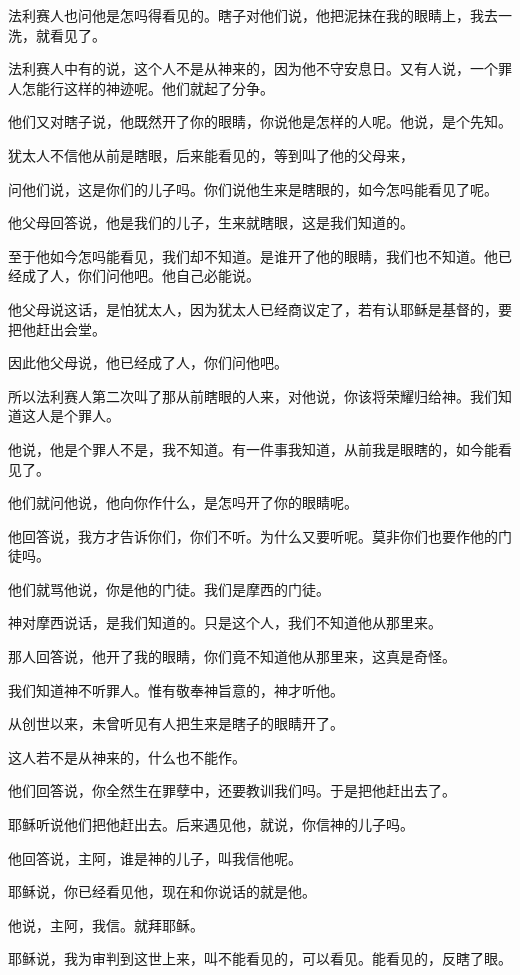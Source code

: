 \documentclass[12pt,oneside]{book}
\begin{document}
法利赛人也问他是怎吗得看见的。瞎子对他们说，他把泥抹在我的眼睛上，我去一洗，就看见了。

法利赛人中有的说，这个人不是从神来的，因为他不守安息日。又有人说，一个罪人怎能行这样的神迹呢。他们就起了分争。

他们又对瞎子说，他既然开了你的眼睛，你说他是怎样的人呢。他说，是个先知。

犹太人不信他从前是瞎眼，后来能看见的，等到叫了他的父母来，

问他们说，这是你们的儿子吗。你们说他生来是瞎眼的，如今怎吗能看见了呢。

他父母回答说，他是我们的儿子，生来就瞎眼，这是我们知道的。

至于他如今怎吗能看见，我们却不知道。是谁开了他的眼睛，我们也不知道。他已经成了人，你们问他吧。他自己必能说。

他父母说这话，是怕犹太人，因为犹太人已经商议定了，若有认耶稣是基督的，要把他赶出会堂。

因此他父母说，他已经成了人，你们问他吧。

所以法利赛人第二次叫了那从前瞎眼的人来，对他说，你该将荣耀归给神。我们知道这人是个罪人。

他说，他是个罪人不是，我不知道。有一件事我知道，从前我是眼瞎的，如今能看见了。

他们就问他说，他向你作什么，是怎吗开了你的眼睛呢。

他回答说，我方才告诉你们，你们不听。为什么又要听呢。莫非你们也要作他的门徒吗。

他们就骂他说，你是他的门徒。我们是摩西的门徒。

神对摩西说话，是我们知道的。只是这个人，我们不知道他从那里来。

那人回答说，他开了我的眼睛，你们竟不知道他从那里来，这真是奇怪。

我们知道神不听罪人。惟有敬奉神旨意的，神才听他。

从创世以来，未曾听见有人把生来是瞎子的眼睛开了。

这人若不是从神来的，什么也不能作。

他们回答说，你全然生在罪孽中，还要教训我们吗。于是把他赶出去了。

耶稣听说他们把他赶出去。后来遇见他，就说，你信神的儿子吗。

他回答说，主阿，谁是神的儿子，叫我信他呢。

耶稣说，你已经看见他，现在和你说话的就是他。

他说，主阿，我信。就拜耶稣。

耶稣说，我为审判到这世上来，叫不能看见的，可以看见。能看见的，反瞎了眼。
\end{document}
